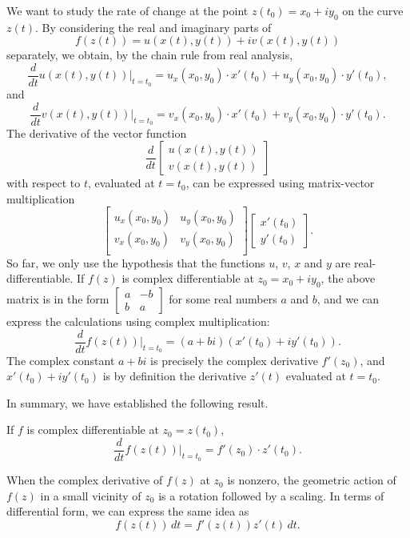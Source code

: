 We want to study the rate of change at the point $z(t_0) = x_0+iy_0$ on the curve $z(t)$.
By considering the real and imaginary parts of 
$$
f(z(t)) = u(x(t),y(t)) + i v(x(t), y(t))
$$
separately, we obtain, by the chain rule from real analysis,
$$
\frac{d}{dt} u(x(t),y(t)) \Big|_{t=t_0}= u_x(x_0,y_0) \cdot x'(t_0) + u_y(x_0,y_0) \cdot  y'(t_0),
$$
and
$$
\frac{d}{dt} v(x(t),y(t)) \Big|_{t=t_0} = v_x(x_0,y_0) \cdot x'(t_0) + v_y(x_0,y_0) \cdot  y'(t_0).
$$
The derivative of the vector function
$$
\frac{d}{dt} \begin{bmatrix} 
	u(x(t),y(t))\\ v(x(t),y(t))
\end{bmatrix}
$$
with respect to $t$, evaluated at $t=t_0$, can be expressed using matrix-vector multiplication
$$
\begin{bmatrix} 
	u_x(x_0,y_0) & u_y(x_0,y_0) \\
	v_x(x_0,y_0) & v_y(x_0,y_0) \\
\end{bmatrix} 
\begin{bmatrix}
	x'(t_0) \\ y'(t_0)
\end{bmatrix}.
$$
So far, we only use the hypothesis that the functions $u$, $v$, $x$ and $y$ are real-differentiable. If $f(z)$ is complex differentiable at $z_0 = x_0+iy_0$, the above matrix is in the form $\begin{bmatrix} a & -b \\ b &a \end{bmatrix} $ for some real numbers $a$ and $b$, and we can express the calculations using complex multiplication:
$$
\frac{d}{dt} f(z(t)) \Big|_{t=t_0} = (a+bi)(x'(t_0)+i y'(t_0)).
$$
The complex constant $a+bi$ is precisely the complex derivative $f'(z_0)$, and $x'(t_0)+i y'(t_0)$ is by definition the derivative $z'(t)$ evaluated at $t=t_0$. 

In summary, we have established the following result.

\begin{svgraybox}
	\begin{theorem}
		If $f$ is complex differentiable at $z_0 = z(t_0)$,
\begin{equation}
	\frac{d}{dt} f(z(t)) \Big|_{t=t_0} = f'(z_0) \cdot z'(t_0) .
	\label{eq:chain_rule2}
\end{equation}
\end{theorem}
\end{svgraybox} 

When the complex derivative of $f(z)$ at $z_0$ is nonzero, the geometric action of $f(z)$ in a small vicinity of $z_0$ is a rotation followed by a scaling.
In terms of differential form, we can express the same idea as
\begin{equation}
	f(z(t)) \, dt =  f'(z(t)) z'(t) \, dt.
	\label{eq:chain_rule_diff_form}
\end{equation}


